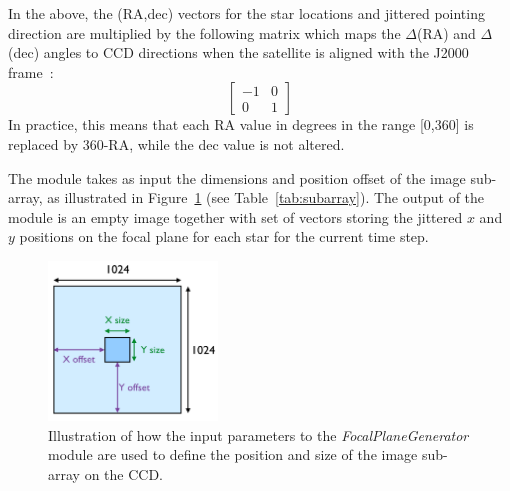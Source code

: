 \documentclass[11pt]{article}      %
\begin{document}
In the above, the (RA,dec) vectors for the star locations and jittered pointing direction are multiplied by the following matrix which maps the $\Delta$(RA) and $\Delta$(dec) angles to CCD directions when the satellite is aligned with the J2000 frame~\cite{rollAngleAlgo}:
\[
\begin{bmatrix} 
-1 & 0 \\ 
0 & 1  
\end{bmatrix}
\]
In practice, this means that each RA value in degrees in the range [0,360] is replaced by 360-RA, while the dec value is not altered.

The module takes as input the dimensions and position offset of the image sub-array, as illustrated in Figure~\ref{fig:subarray} (see Table~\ref{tab:subarray}).  The output of the module is an empty image together with set of vectors storing the jittered $x$ and $y$ positions on the focal plane for each star for the current time step.

\begin{figure}[hbtp]
  \begin{center}
    \includegraphics[width=0.4\textwidth]{subarray.png}
    \caption{Illustration of how the input parameters to the {\it FocalPlaneGenerator} module are used to define the position and size of the image sub-array on the CCD.}
    \label{fig:subarray}
  \end{center}
\end{figure}
\end{document}
